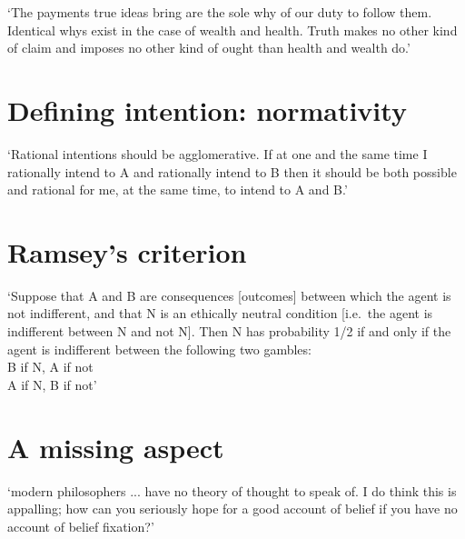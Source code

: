 \documentclass[11pt]{extarticle}
\begin{document}
\begin{multicols}{3}
‘The payments true ideas bring are the sole why of our duty to follow them.  Identical whys exist in the case of wealth and health.  Truth makes no other kind of claim and imposes no other kind of ought than health and wealth do.’\citep{James:1907ae} %

\section{Defining intention: normativity}
`Rational intentions should be agglomerative. If at one and the same time I rationally intend to A and rationally intend to B then it should be both possible and rational for me, at the same time, to intend to A and B.'\citep{bratman_faces_1999} %
 

\section{Ramsey's criterion}
`Suppose that A and B are consequences [outcomes] between which the agent is not indifferent, and that N is an ethically neutral condition [i.e.\ the agent is indifferent between N and not N]. 
Then N has probability 1/2 if and only if the agent is indifferent between the following two gambles:
	\\ \hspace*{10 mm} B if N, A if not 
	\\ \hspace*{10 mm} A if N, B if not'%
	\citep%
	{Jeffrey:1983oe}


\section{A missing aspect}
`modern philosophers ... have no theory of thought to speak of. I do think this is appalling; how can you seriously hope for a good account of belief if you have no account of belief fixation?'%
\citep%
{Fodor:1987rt}




\footnotesize 


\end{multicols}
\end{document}
